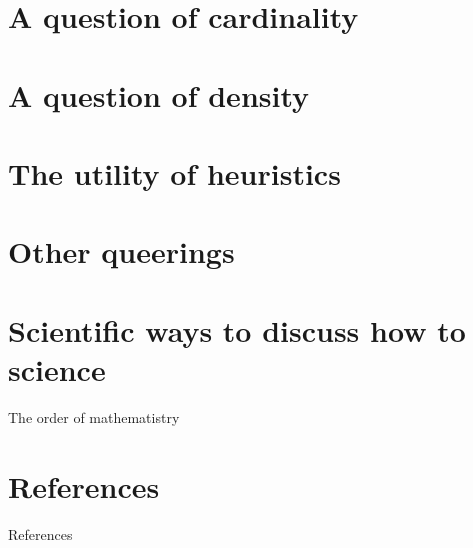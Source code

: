 \documentclass{beamer}
\begin{document}
\section{A question of cardinality}

\section{A question of density}

\section{The utility of heuristics}

\section{Other queerings}

\section{Scientific ways to discuss how to science}



\begin{frame}{The order of mathematistry}

\end{frame}


\section*{References}

\begin{frame}[allowframebreaks]{References}
\printbibliography
\end{frame}
\end{document}
